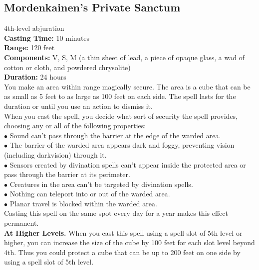 \documentclass[11pt, A4paper, english]{article}
\begin{document}
		\subsection{Mordenkainen's Private Sanctum}
4th-level abjuration \\
\textbf{Casting Time:} 10 minutes \\
\textbf{Range:} 120 feet \\
\textbf{Components:} V, S, M (a thin sheet of lead, a piece of opaque glass, a wad of cotton or cloth, and powdered chrysolite) \\
\textbf{Duration:} 24 hours \\
You make an area within range magically secure. The area is a cube that can be as small as 5 feet to as large as 100 feet on each side. The spell lasts for the duration or until you use an action to dismiss it. \\
When you cast the spell, you decide what sort of security the spell provides, choosing any or all of the following properties: \\
$\bullet$ Sound can't pass through the barrier at the edge of the warded area. \\
$\bullet$ The barrier of the warded area appears dark and foggy, preventing vision (including darkvision) through it. \\
$\bullet$ Sensors created by divination spells can't appear inside the protected area or pass through the barrier at its perimeter. \\
$\bullet$ Creatures in the area can't be targeted by divination spells. \\
$\bullet$ Nothing can teleport into or out of the warded area. \\
$\bullet$ Planar travel is blocked within the warded area. \\
Casting this spell on the same spot every day for a year makes this effect permanent. \\
\textbf{At Higher Levels.} When you cast this spell using a spell slot of 5th level or higher, you can increase the size of the cube by 100 feet for each slot level beyond 4th. Thus you could protect a cube that can be up to 200 feet on one side by using a spell slot of 5th level.
\end{document}
